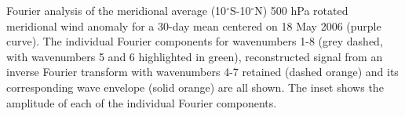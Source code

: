 \label{fig:transform}
Fourier analysis of the meridional average (10$^{\circ}$S-10$^{\circ}$N) 500 hPa rotated meridional wind anomaly for a 30-day mean centered on 18 May 2006 (purple curve). The individual Fourier components for wavenumbers 1-8 (grey dashed, with wavenumbers 5 and 6 highlighted in green), reconstructed signal from an inverse Fourier transform with wavenumbers 4-7 retained (dashed orange) and its corresponding wave envelope (solid orange) are all shown. The inset shows the amplitude of each of the individual Fourier components. 